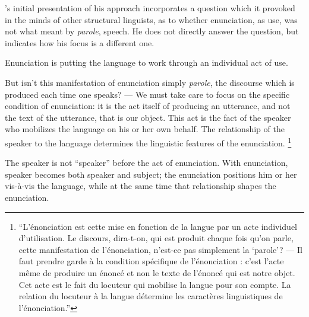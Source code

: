 \documentclass[output=paper]{langscibook}
\begin{document}
{\Benveniste}'s initial presentation of his approach incorporates a question which it provoked in the minds of other structural linguists, as to whether enunciation, as use, was not what {\Saussure} meant by \emph{parole}, speech. He does not directly answer the question, but indicates how his focus is a different one.

\largerpage[-1]
\begin{modquote}
Enunciation is putting the language to work through an individual act of use.
 
But isn't this manifestation of enunciation simply \emph{parole}, the discourse which is produced each time one speaks? — We must take care to focus on the specific condition of enunciation: it is the act itself of producing an utterance, and not the text of the utterance, that is our object. This act is the fact of the speaker who mobilizes the language on his or her own behalf. The relationship of the speaker to the language determines the linguistic features of the enunciation. \citep[80]{Benveniste1970appareil}\footnote{``L'énonciation est cette mise en fonction de la langue par un acte individuel d'utilisation. Le discours, dira-t-on, qui est produit chaque fois qu'on parle, cette manifestation de l'énonciation, n'est-ce pas simplement la `parole'? — Il faut prendre garde à la condition spécifique de l'énonciation : c’est l'acte même de produire un énoncé et non le texte de l'énoncé qui est notre objet. Cet acte est le fait du locuteur qui mobilise la langue pour son compte. La relation du locuteur à la langue détermine les caractères linguistiques de l'énonciation.''}
\end{modquote}

The speaker is not ``speaker'' before the act of enunciation. With enunciation, speaker becomes both speaker and subject; the enunciation positions him or her vis-à-vis the language, while at the same time that relationship shapes the enunciation.
\end{document}
